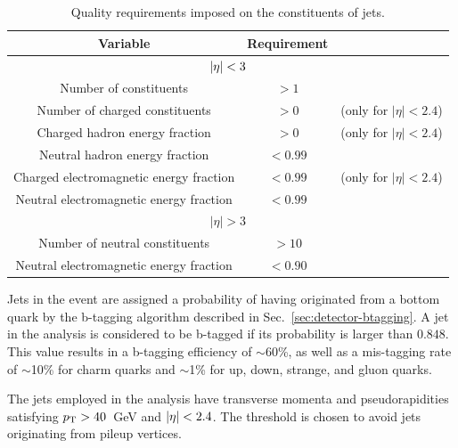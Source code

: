 
\begin{table}[ht!]
\centering
\begin{tabular}{ ccc }
Variable & Requirement & \\ \hline
\multicolumn{3}{c}{$|\eta| < 3$} \\ \hline    
Number of constituents & $>1$ &  \\
Number of charged constituents & $>0$ & (only for $|\eta| < 2.4$) \\
Charged hadron energy fraction & $>0$ & (only for $|\eta| < 2.4$) \\
Neutral hadron energy fraction & $<0.99$ &  \\
Charged electromagnetic energy fraction & $<0.99$ & (only for $|\eta| < 2.4$)\\
Neutral electromagnetic energy fraction & $<0.99$ &  \\
\hline
\multicolumn{3}{c}{$|\eta| > 3$} \\ \hline        
Number of neutral constituents & $>10$ &  \\
Neutral electromagnetic energy fraction & $<0.90$ &  \\
\end{tabular}
\caption{Quality requirements imposed on the constituents of jets.}
\label{tab:jet-id}
\end{table}

Jets in the event are assigned a probability of having originated from a bottom 
quark by the b-tagging %
algorithm described in Sec.~\ref{sec:detector-btagging}. A jet in the analysis 
is considered to be b-tagged if its probability is larger than $0.848$. This 
value results in a b-tagging efficiency of $\sim$60\%, as well as a mis-tagging 
rate of $\sim$10\% for charm quarks and $\sim$1\% for up, down, strange, and 
gluon quarks.

The jets employed in the analysis have transverse momenta and pseudorapidities 
satisfying ${p_{\text T}}>40$~GeV and $|\eta|<2.4$. The \pt threshold is chosen to avoid 
jets originating from pileup vertices.

